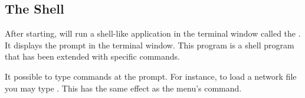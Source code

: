 \subsection{The \sr{} Shell}
\label{sec:termapp}

After starting, \sr{} will run a shell-like application in the terminal
window called the .  It displays the prompt
 in the terminal window.  This program is a
 shell program that has been extended with
\sr{} specific commands.

It possible to type \tcl{} \sr{} commands at the prompt.  For
instance, to load a network file you may type .  This has the same effect as the 
menu's  command.


